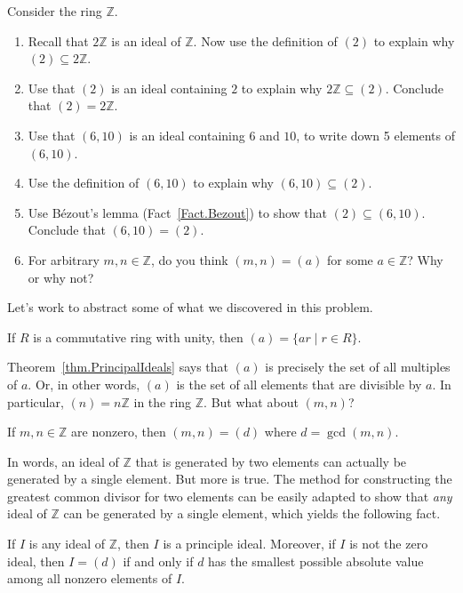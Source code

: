 \begin{problem}
Consider the ring $\mathbb{Z}$. 
\begin{enumerate}
\item Recall that $2\mathbb{Z}$ is an ideal of $\mathbb{Z}$. Now use the definition of $(2)$ to explain why $(2) \subseteq 2\mathbb{Z}$.
\item Use  that $(2)$ is an ideal containing $2$ to explain why $2\mathbb{Z}\subseteq (2)$. Conclude that $(2) = 2\mathbb{Z}$.
\item Use  that $(6,10)$ is an ideal containing $6$ and $10$, to write down 5 elements of $(6,10)$. 
\item Use the definition of $(6,10)$ to explain why $(6,10)\subseteq (2)$.
\item Use B\'ezout's lemma (Fact~\ref{Fact.Bezout}) to show that $(2) \subseteq (6,10)$. Conclude that $(6,10) = (2)$.
\item For arbitrary $m,n\in \mathbb{Z}$, do you think $(m,n) = (a)$ for some $a\in \mathbb{Z}$? Why or why not?
\end{enumerate}
\end{problem}

Let's work to abstract some of what we discovered in this problem.

\begin{theorem}\label{thm.PrincipalIdeals}
If $R$ is a commutative ring with unity, then $(a)=\{ar\mid r\in R\}$.
\end{theorem}

Theorem~\ref{thm.PrincipalIdeals} says that $(a)$ is precisely the set of all multiples of $a$. Or, in other words, $(a)$ is the set of all elements that are divisible by $a$. In particular, $(n) = n\mathbb{Z}$ in the ring $\mathbb{Z}$. But what about $(m,n)$?

\begin{theorem}
If $m,n\in \mathbb{Z}$ are nonzero, then $(m,n) = (d)$ where $d = \gcd(m,n)$.
\end{theorem}

In words, an ideal of $\mathbb{Z}$ that is generated by two elements can actually be generated by a single element. But more is true. The method for constructing the greatest common divisor for two elements can be easily adapted to show that \emph{any} ideal of $\mathbb{Z}$ can be generated by a single element, which yields the following fact.

\begin{fact}\label{fact.ZPID}
If $I$ is any ideal of $\mathbb{Z}$, then $I$ is a principle ideal. Moreover, if $I$ is not the zero ideal, then $I = (d)$ if and only if $d$ has the smallest possible absolute value among all nonzero elements of $I$.
\end{fact}

